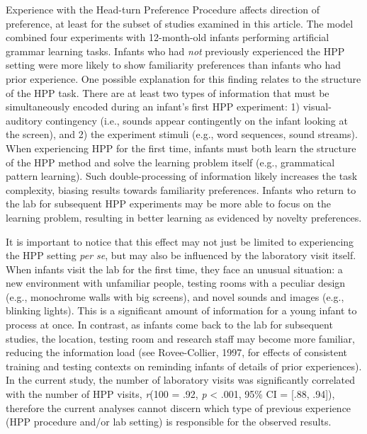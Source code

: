 \documentclass[english,man,man,floatsintext]{apa6}
\begin{document}
Experience with the Head-turn Preference Procedure affects direction of preference, at least for the subset of studies examined in this article. The model combined four experiments with 12-month-old infants performing artificial grammar learning tasks. Infants who had \emph{not} previously experienced the HPP setting were more likely to show familiarity preferences than infants who had prior experience. One possible explanation for this finding relates to the structure of the HPP task. There are at least two types of information that must be simultaneously encoded during an infant's first HPP experiment: 1) visual-auditory contingency (i.e., sounds appear contingently on the infant looking at the screen), and 2) the experiment stimuli (e.g., word sequences, sound streams). When experiencing HPP for the first time, infants must both learn the structure of the HPP method and solve the learning problem itself (e.g., grammatical pattern learning). Such double-processing of information likely increases the task complexity, biasing results towards familiarity preferences. Infants who return to the lab for subsequent HPP experiments may be more able to focus on the learning problem, resulting in better learning as evidenced by novelty preferences.

It is important to notice that this effect may not just be limited to experiencing the HPP setting \emph{per se}, but may also be influenced by the laboratory visit itself. When infants visit the lab for the first time, they face an unusual situation: a new environment with unfamiliar people, testing rooms with a peculiar design (e.g., monochrome walls with big screens), and novel sounds and images (e.g., blinking lights). This is a significant amount of information for a young infant to process at once. In contrast, as infants come back to the lab for subsequent studies, the location, testing room and research staff may become more familiar, reducing the information load (see Rovee-Collier, 1997, for effects of consistent training and testing contexts on reminding infants of details of prior experiences). In the current study, the number of laboratory visits was significantly correlated with the number of HPP visits, \emph{r}(100 = .92, \emph{p} \textless{} .001, 95\% CI = {[}.88, .94{]}), therefore the current analyses cannot discern which type of previous experience (HPP procedure and/or lab setting) is responsible for the observed results.
\end{document}
